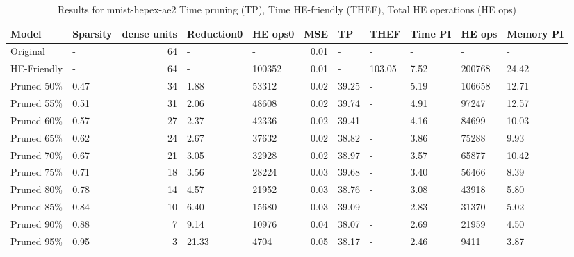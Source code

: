 \begin{table}
\centering
\caption{Results for mnist-hepex-ae2  Time pruning (TP), Time HE-friendly (THEF), Total HE operations (HE ops)}
\begin{tabular}{llrllrlllll}
\toprule
      Model & Sparsity &  dense units & Reduction0 & HE ops0 &  MSE &    TP &   THEF & Time PI & HE ops & Memory PI \\
\midrule
   Original &        - &           64 &          - &       - & 0.01 &     - &      - &       - &      - &         - \\
HE-Friendly &        - &           64 &          - &  100352 & 0.01 &     - & 103.05 &    7.52 & 200768 &     24.42 \\
 Pruned 50\% &     0.47 &           34 &       1.88 &   53312 & 0.02 & 39.25 &      - &    5.19 & 106658 &     12.71 \\
 Pruned 55\% &     0.51 &           31 &       2.06 &   48608 & 0.02 & 39.74 &      - &    4.91 &  97247 &     12.57 \\
 Pruned 60\% &     0.57 &           27 &       2.37 &   42336 & 0.02 & 39.41 &      - &    4.16 &  84699 &     10.03 \\
 Pruned 65\% &     0.62 &           24 &       2.67 &   37632 & 0.02 & 38.82 &      - &    3.86 &  75288 &      9.93 \\
 Pruned 70\% &     0.67 &           21 &       3.05 &   32928 & 0.02 & 38.97 &      - &    3.57 &  65877 &     10.42 \\
 Pruned 75\% &     0.71 &           18 &       3.56 &   28224 & 0.03 & 39.68 &      - &    3.40 &  56466 &      8.39 \\
 Pruned 80\% &     0.78 &           14 &       4.57 &   21952 & 0.03 & 38.76 &      - &    3.08 &  43918 &      5.80 \\
 Pruned 85\% &     0.84 &           10 &       6.40 &   15680 & 0.03 & 39.09 &      - &    2.83 &  31370 &      5.02 \\
 Pruned 90\% &     0.88 &            7 &       9.14 &   10976 & 0.04 & 38.07 &      - &    2.69 &  21959 &      4.50 \\
 Pruned 95\% &     0.95 &            3 &      21.33 &    4704 & 0.05 & 38.17 &      - &    2.46 &   9411 &      3.87 \\
\bottomrule
\end{tabular}
\end{table}
